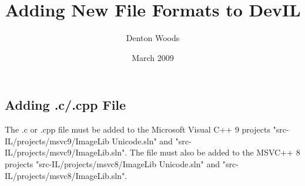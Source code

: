 \documentclass[letterpaper,12pt]{article}
\title{Adding New File Formats to DevIL}
\author{Denton Woods}
\date{March 2009}
\begin{document}
\maketitle

\subsection*{Adding .c/.cpp File}
The .c or .cpp file must be added to the Microsoft Visual C++ 9 projects "src-IL/projects/msvc9/ImageLib Unicode.sln" and "src-IL/projects/msvc9/ImageLib.sln".  The file must also be added to the MSVC++ 8 projects "src-IL/projects/msvc8/ImageLib Unicode.sln" and "src-IL/projects/msvc8/ImageLib.sln".
\end{document}
